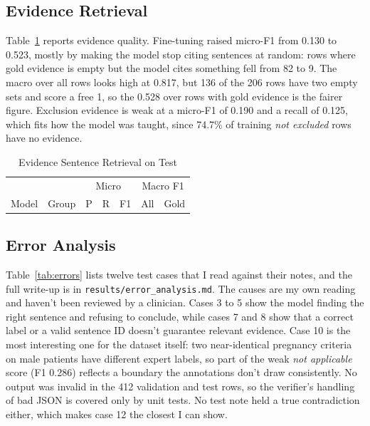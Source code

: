 \documentclass[conference]{IEEEtran}
\begin{document}
\subsection{Evidence Retrieval}

Table~\ref{tab:evidence} reports evidence quality. Fine-tuning raised micro-F1 from 0.130 to 0.523, mostly by making the model stop citing sentences at random: rows where gold evidence is empty but the model cites something fell from 82 to 9. The macro over all rows looks high at 0.817, but 136 of the 206 rows have two empty sets and score a free 1, so the 0.528 over rows with gold evidence is the fairer figure. Exclusion evidence is weak at a micro-F1 of 0.190 and a recall of 0.125, which fits how the model was taught, since 74.7\% of training \emph{not excluded} rows have no evidence.

\begin{table}[t]
\caption{Evidence Sentence Retrieval on Test}
\label{tab:evidence}
\centering
\footnotesize
\setlength{\tabcolsep}{4pt}
\begin{tabular}{@{}llrrrrr@{}}
\toprule
 & & \multicolumn{3}{c}{Micro} & \multicolumn{2}{c}{Macro F1} \\
Model & Group & P & R & F1 & All & Gold \\
\midrule

\end{tabular}
\end{table}

\subsection{Error Analysis}

Table~\ref{tab:errors} lists twelve test cases that I read against their notes, and the full write-up is in \texttt{results/error\_analysis.md}. The causes are my own reading and haven't been reviewed by a clinician. Cases 3 to 5 show the model finding the right sentence and refusing to conclude, while cases 7 and 8 show that a correct label or a valid sentence ID doesn't guarantee relevant evidence. Case 10 is the most interesting one for the dataset itself: two near-identical pregnancy criteria on male patients have different expert labels, so part of the weak \emph{not applicable} score (F1 0.286) reflects a boundary the annotations don't draw consistently. No output was invalid in the 412 validation and test rows, so the verifier's handling of bad JSON is covered only by unit tests. No test note held a true contradiction either, which makes case 12 the closest I can show.
\end{document}
